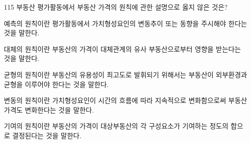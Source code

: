 \begin{question}{115}
부동산 평가활동에서 부동산 가격의 원칙에 관한 설명으로 옳지 않은 것은?
\begin{choices}
  \item 예측의 원칙이란 평가활동에서 가치형성요인의 변동추이 또는 동향을 주시해야 한다는 것을 말한다.
  \item 대체의 원칙이란 부동산의 가격이 대체관계의 유사 부동산으로부터 영향을 받는다는 것을 말한다.
  \item 균형의 원칙이란 부동산의 유용성이 최고도로 발휘되기 위해서는 부동산이 외부환경과 균형을 이루어야 한다는 것을 말한다.
  \item 변동의 원칙이란 가치형성요인이 시간의 흐름에 따라 지속적으로 변화함으로써 부동산 가격도 변화한다는 것을 말한다.
  \item 기여의 원칙이란 부동산의 가격이 대상부동산의 각 구성요소가 기여하는 정도의 합으로 결정된다는 것을 말한다.
\end{choices}
\end{question}

